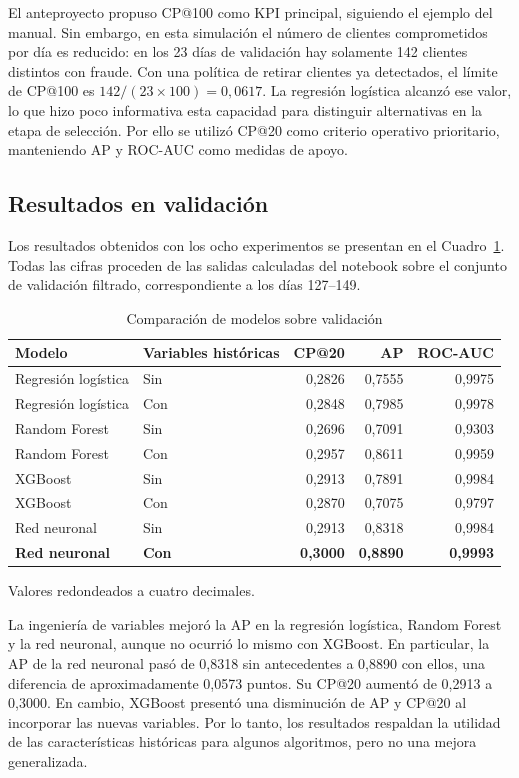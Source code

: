 El anteproyecto propuso CP@100 como KPI principal, siguiendo el ejemplo del manual. Sin embargo, en esta simulación el número de clientes comprometidos por día es reducido: en los 23 días de validación hay solamente 142 clientes distintos con fraude. Con una política de retirar clientes ya detectados, el límite de CP@100 es $142/(23\times100)=0,0617$. La regresión logística alcanzó ese valor, lo que hizo poco informativa esta capacidad para distinguir alternativas en la etapa de selección. Por ello se utilizó CP@20 como criterio operativo prioritario, manteniendo AP y ROC-AUC como medidas de apoyo.

\subsection{Resultados en validación}
Los resultados obtenidos con los ocho experimentos se presentan en el Cuadro~\ref{tab:validacion}. Todas las cifras proceden de las salidas calculadas del notebook sobre el conjunto de validación filtrado, correspondiente a los días 127--149.

\begin{table}[!htbp]
\centering
\small
\caption{Comparación de modelos sobre validación}
\label{tab:validacion}
\begin{tabular}{@{}llrrr@{}}
\toprule
\textbf{Modelo} & \textbf{Variables históricas} & \textbf{CP@20} & \textbf{AP} & \textbf{ROC-AUC} \\
\midrule
Regresión logística & Sin & 0,2826 & 0,7555 & 0,9975 \\
Regresión logística & Con & 0,2848 & 0,7985 & 0,9978 \\
Random Forest & Sin & 0,2696 & 0,7091 & 0,9303 \\
Random Forest & Con & 0,2957 & 0,8611 & 0,9959 \\
XGBoost & Sin & 0,2913 & 0,7891 & 0,9984 \\
XGBoost & Con & 0,2870 & 0,7075 & 0,9797 \\
Red neuronal & Sin & 0,2913 & 0,8318 & 0,9984 \\
\textbf{Red neuronal} & \textbf{Con} & \textbf{0,3000} & \textbf{0,8890} & \textbf{0,9993} \\
\bottomrule
\end{tabular}
\par\smallskip
{\footnotesize Valores redondeados a cuatro decimales.}
\end{table}

La ingeniería de variables mejoró la AP en la regresión logística, Random Forest y la red neuronal, aunque no ocurrió lo mismo con XGBoost. En particular, la AP de la red neuronal pasó de 0,8318 sin antecedentes a 0,8890 con ellos, una diferencia de aproximadamente 0,0573 puntos. Su CP@20 aumentó de 0,2913 a 0,3000. En cambio, XGBoost presentó una disminución de AP y CP@20 al incorporar las nuevas variables. Por lo tanto, los resultados respaldan la utilidad de las características históricas para algunos algoritmos, pero no una mejora generalizada.

